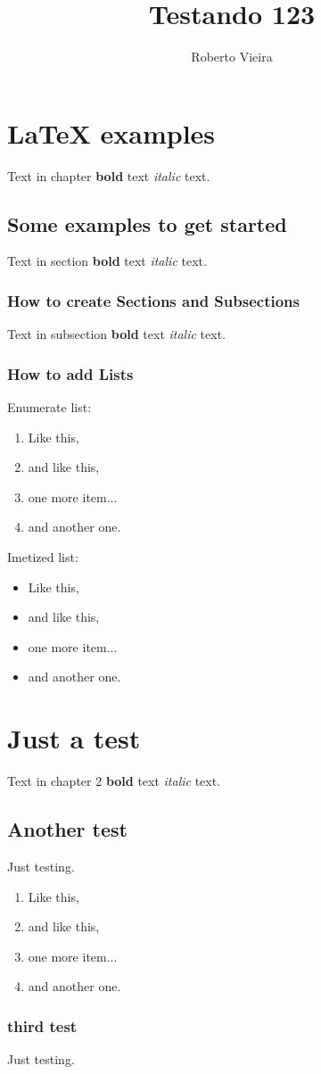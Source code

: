 \documentclass{article}
\title{Testando 123}
\author{Roberto Vieira}
\begin{document}
\chapter{LaTeX examples}

Text in chapter \textbf{bold} text \emph{italic} text.

\section{Some examples to get started}

Text in section \textbf{bold} text \emph{italic} text.

\subsection{How to create Sections and Subsections}

Text in subsection \textbf{bold} text \emph{italic} text.

\subsection{How to add Lists}

Enumerate list:

\begin{enumerate}
\item Like this,
\item and like this,
\item one more item...
\item and another one.
\end{enumerate}

Imetized list:

\begin{itemize}
\item Like this,
\item and like this,
\item one more item...
\item and another one.
\end{itemize}

\chapter{Just a test}

Text in chapter 2 \textbf{bold} text \emph{italic} text.

\section{Another test}

Just testing.

\begin{enumerate}
\item Like this,
\item and like this,
\item one more item...
\item and another one.
\end{enumerate}

\subsection{third test}

Just testing.
\end{document}
